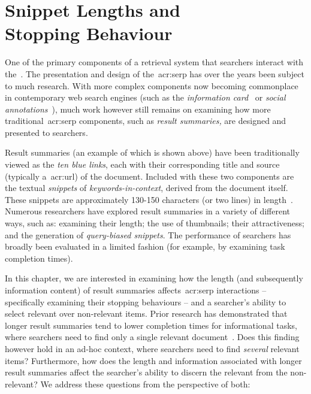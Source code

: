 
\chapter[Snippet Lengths and Stopping Behaviour]{Snippet Lengths and\\Stopping Behaviour}\label{chap:snippets}
One of the primary components of a retrieval system that searchers interact with the~. The presentation and design of the~\gls{acr:serp} has over the years been subject to much research. With more complex components now becoming commonplace in contemporary web search engines (such as the \emph{information card}~\citep{navalpakkam2013non_linear_serp, bota2016information_cards} or \emph{social annotations}~\citep{muralidharan2012social_annotations}), much work however still remains on examining how more traditional~\gls{acr:serp} components, such as \emph{result summaries,} are designed and presented to searchers.

\begin{figure}[h]
    \centering
    \vspace{4mm}
    \label{fig:serpintro}
    \vspace{-5mm}
\end{figure}

Result summaries (an example of which is shown above) have been traditionally viewed as the \emph{ten blue links}, each with their corresponding title and source (typically a~\gls{acr:url}) of the document. Included with these two components are the textual \emph{snippets} of \emph{keywords-in-context}, derived from the document itself. These snippets are approximately 130-150 characters (or two lines) in length~\citep{hearst2009_search}. Numerous researchers have explored result summaries in a variety of different ways, such as: examining their length; the use of thumbnails; their attractiveness; and the generation of \emph{query-biased snippets}. The performance of searchers has broadly been evaluated in a limited fashion (for example, by examining task completion times).

In this chapter, we are interested in examining how the length (and subsequently information content) of result summaries affects~\gls{acr:serp} interactions -- specifically examining their stopping behaviours -- and a searcher's ability to select relevant over non-relevant items. Prior research has demonstrated that longer result summaries tend to lower completion times for informational tasks, where searchers need to find only a single relevant document~\citep{cutrell2007eye_tracking}. Does this finding however hold in an ad-hoc context, where searchers need to find \emph{several} relevant items? Furthermore, how does the length and information associated with longer result summaries affect the searcher's ability to discern the relevant from the non-relevant? We address these questions from the perspective of both:

